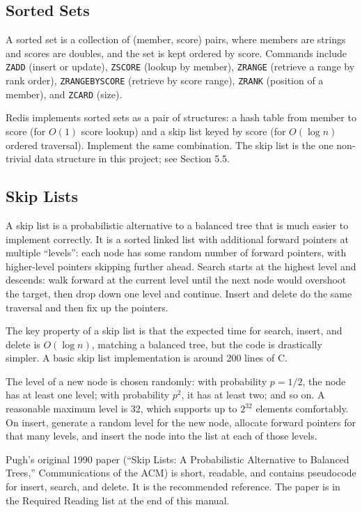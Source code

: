 \documentclass[11pt,a4paper]{article}
\begin{document}
\subsection{Sorted Sets}
A sorted set is a collection of (member, score) pairs, where members are strings and scores are doubles, and the set is kept ordered by score. Commands include \texttt{ZADD} (insert or update), \texttt{ZSCORE} (lookup by member), \texttt{ZRANGE} (retrieve a range by rank order), \texttt{ZRANGEBYSCORE} (retrieve by score range), \texttt{ZRANK} (position of a member), and \texttt{ZCARD} (size).

Redis implements sorted sets as a pair of structures: a hash table from member to score (for $O(1)$ score lookup) and a skip list keyed by score (for $O(\log n)$ ordered traversal). Implement the same combination. The skip list is the one non-trivial data structure in this project; see Section 5.5.

\subsection{Skip Lists}
A skip list is a probabilistic alternative to a balanced tree that is much easier to implement correctly. It is a sorted linked list with additional forward pointers at multiple ``levels'': each node has some random number of forward pointers, with higher-level pointers skipping further ahead. Search starts at the highest level and descends: walk forward at the current level until the next node would overshoot the target, then drop down one level and continue. Insert and delete do the same traversal and then fix up the pointers.

The key property of a skip list is that the expected time for search, insert, and delete is $O(\log n)$, matching a balanced tree, but the code is drastically simpler. A basic skip list implementation is around 200 lines of C.

The level of a new node is chosen randomly: with probability $p = 1/2$, the node has at least one level; with probability $p^2$, it has at least two; and so on. A reasonable maximum level is 32, which supports up to $2^{32}$ elements comfortably. On insert, generate a random level for the new node, allocate forward pointers for that many levels, and insert the node into the list at each of those levels.

Pugh's original 1990 paper (``Skip Lists: A Probabilistic Alternative to Balanced Trees,'' Communications of the ACM) is short, readable, and contains pseudocode for insert, search, and delete. It is the recommended reference. The paper is in the Required Reading list at the end of this manual.
\end{document}
